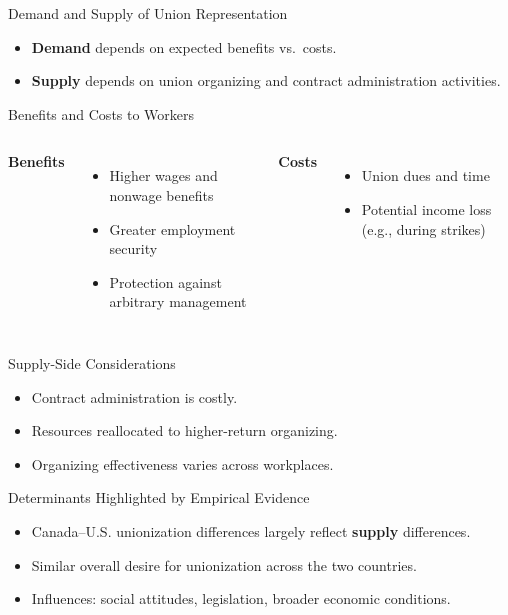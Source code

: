 \documentclass[aspectratio=169]{beamer}
\begin{document}
\begin{frame}{Demand and Supply of Union Representation}
\transfade
\begin{itemize}[<+->]
  \item \textbf{Demand} depends on expected benefits vs.\ costs.
  \item \textbf{Supply} depends on union organizing and contract administration activities.
\end{itemize}
\end{frame}

\begin{frame}{Benefits and Costs to Workers}
\transfade
\begin{columns}[T,onlytextwidth]
\textbf{Benefits}
\begin{itemize}[<+->]
  \item Higher wages and nonwage benefits
  \item Greater employment security
  \item Protection against arbitrary management
\end{itemize}
\textbf{Costs}
\begin{itemize}[<+->]
  \item Union dues and time
  \item Potential income loss (e.g., during strikes)
\end{itemize}
\end{columns}
\end{frame}

\begin{frame}{Supply-Side Considerations}
\transfade
\begin{itemize}[<+->]
  \item Contract administration is costly.
  \item Resources reallocated to higher-return organizing.
  \item Organizing effectiveness varies across workplaces.
\end{itemize}
\end{frame}

\begin{frame}{Determinants Highlighted by Empirical Evidence}
\transfade
\begin{itemize}[<+->]
  \item Canada--U.S. unionization differences largely reflect \textbf{supply} differences.
  \item Similar overall desire for unionization across the two countries.
  \item Influences: social attitudes, legislation, broader economic conditions.
\end{itemize}
\end{frame}
\end{document}
